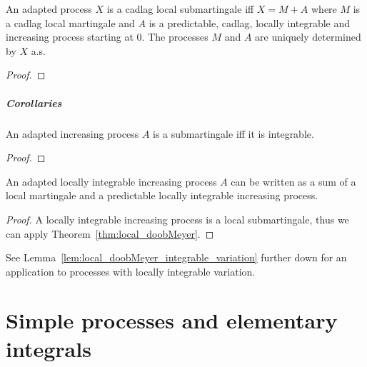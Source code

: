 \begin{theorem}\label{thm:local_doobMeyer}
  \leanok
An adapted process $X$ is a cadlag local submartingale iff $X = M + A$ where $M$ is a cadlag local martingale and $A$ is a predictable, cadlag, locally integrable and increasing process starting at $0$.
The processes $M$ and $A$ are uniquely determined by $X$ a.s.
\end{theorem}

\begin{proof}

\end{proof}


\paragraph{Corollaries}

\begin{lemma}\label{lem:submartingale_iff_integrable}
An adapted increasing process $A$ is a submartingale iff it is integrable.
\end{lemma}

\begin{proof}

\end{proof}


\begin{lemma}\label{lem:local_doobMeyer_increasing}
An adapted locally integrable increasing process $A$ can be written as a sum of a local martingale and a predictable locally integrable increasing process.
\end{lemma}

\begin{proof}
A locally integrable increasing process is a local submartingale, thus we can apply Theorem~\ref{thm:local_doobMeyer}.
\end{proof}


See Lemma~\ref{lem:local_doobMeyer_integrable_variation} further down for an application to processes with locally integrable variation.


\chapter{Simple processes and elementary integrals}

